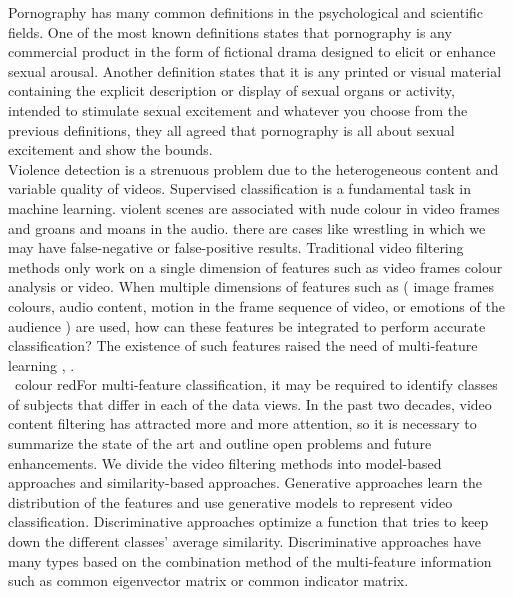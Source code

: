 \documentclass[runningheads]{llncs}
\begin{document}
 Pornography has many common definitions in the psychological and scientific fields. One of the most known definitions states that pornography \cite{mosher1988pornography} is any commercial product in the form of fictional drama designed to elicit or enhance sexual arousal. Another definition states that it is any printed or visual material containing the explicit description or display of sexual organs or activity, intended to stimulate sexual excitement and whatever you choose from the previous definitions, they all agreed that pornography is all about sexual excitement and show the bounds.\\
 
Violence detection is a strenuous problem due to the heterogeneous content and variable quality of videos. Supervised classification is a fundamental task in machine learning. violent scenes are associated with nude colour in video frames and groans and moans in the audio. there are cases like wrestling in which we may have false-negative or false-positive results. Traditional video filtering methods only work on a single dimension of features such as video frames colour analysis or video. When multiple dimensions of features such as ( image frames colours, audio content, motion in the frame sequence of video, or emotions of the audience ) are used, how can these features be integrated to perform accurate classification? The existence of such features raised the need of multi-feature learning \cite{xu2013survey}, \cite{zhao2017multi} \cite{short2012review}. \\

{\ colour {red}For multi-feature classification, it may be required to identify classes of subjects that differ in each of the data views.} In the past two decades, video content filtering has attracted more and more attention, so it is necessary to summarize the state of the art and outline open problems and future enhancements. We divide the video filtering methods into model-based approaches and similarity-based approaches. Generative approaches learn the distribution of the features and use generative models to represent video classification. Discriminative approaches optimize a function that tries to keep down the different classes’ average similarity. Discriminative approaches have many types based on the combination method of the multi-feature information such as common eigenvector matrix or common indicator matrix.\\
\end{document}
